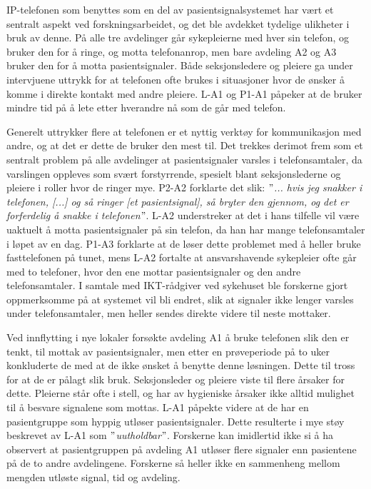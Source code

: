 \noindent
IP-telefonen som benyttes som en del av pasientsignalsystemet har vært et sentralt aspekt ved forskningsarbeidet, og det ble avdekket tydelige ulikheter i bruk av denne. På alle tre avdelinger går sykepleierne med hver sin telefon, og bruker den for å ringe, og motta telefonanrop, men bare avdeling A2 og A3 bruker den for å motta pasientsignaler. Både seksjonsledere og pleiere ga under intervjuene uttrykk for at telefonen ofte brukes i situasjoner hvor de ønsker å komme i direkte kontakt med andre pleiere. L-A1 og P1-A1 påpeker at de bruker mindre tid på å lete etter hverandre nå som de går med telefon.   

\noindent
Generelt uttrykker flere at telefonen er et nyttig verktøy for kommunikasjon med andre, og at det er dette de bruker den mest til. Det trekkes derimot frem som et sentralt problem på alle avdelinger at pasientsignaler varsles i telefonsamtaler, da varslingen oppleves som svært forstyrrende, spesielt blant seksjonslederne og pleiere i roller hvor de ringer mye. P2-A2 forklarte det slik: \textit{ $"$... hvis jeg snakker i telefonen, [...] og så ringer [et pasientsignal], så bryter den gjennom, og det er forferdelig å snakke i telefonen$"$}. L-A2 understreker at det i hans tilfelle vil være uaktuelt å motta pasientsignaler på sin telefon, da han har mange telefonsamtaler i løpet av en dag. P1-A3 forklarte at de løser dette problemet med å heller bruke fasttelefonen på tunet, mens L-A2 fortalte at ansvarshavende sykepleier ofte går med to telefoner, hvor den ene mottar pasientsignaler og den andre telefonsamtaler. I samtale med IKT-rådgiver ved sykehuset ble forskerne gjort oppmerksomme på at systemet vil bli endret, slik at signaler ikke lenger varsles under telefonsamtaler, men heller sendes direkte videre til neste mottaker.

\noindent
Ved innflytting i nye lokaler forsøkte avdeling A1 å bruke telefonen slik den er tenkt, til mottak av pasientsignaler, men etter en prøveperiode på to uker konkluderte de med at de ikke ønsket å benytte denne løsningen. Dette til tross for at de er pålagt slik bruk. Seksjonsleder og pleiere viste til flere årsaker for dette. Pleierne står ofte i stell, og har av hygieniske årsaker ikke alltid mulighet til å besvare signalene som mottas. L-A1 påpekte videre at de har en pasientgruppe som hyppig utløser pasientsignaler. Dette resulterte i mye støy beskrevet av L-A1 som \textit{$"$uutholdbar$"$}. Forskerne kan imidlertid ikke si å ha observert at pasientgruppen på avdeling A1 utløser flere signaler enn pasientene på de to andre avdelingene. Forskerne så heller ikke en sammenheng mellom mengden utløste signal, tid og avdeling. 

